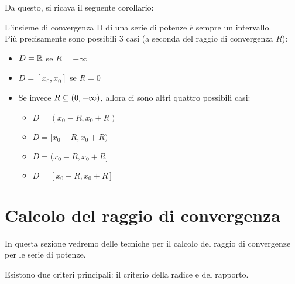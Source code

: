 Da questo, si ricava il seguente corollario:
\begin{corollario}{}
  L'insieme di convergenza D di una serie di potenze è sempre un intervallo.\\
  Più precisamente sono possibili 3 casi (a seconda del raggio di convergenza $R$):
  \begin{itemize}
  \item $D = \mathbb{R}$ se $R = +\infty$
  \item $D = [x_0,x_0]$ se $R = 0$
  \item Se invece $R \subseteq (0,+\infty)$, allora ci sono altri quattro possibili casi:
  \begin{itemize}
  \item $D = (x_0-R,x_0+R)$
  \item $D = [x_0-R,x_0+R)$
  \item $D = (x_0-R,x_0+R]$
  \item $D = [x_0-R,x_0+R]$
  \end{itemize}
  \end{itemize}
\end{corollario}

\section{Calcolo del raggio di convergenza}
In questa sezione vedremo delle tecniche per il calcolo del raggio di convergenze per le serie di potenze.

Esistono due criteri principali: il criterio della radice e del rapporto.

